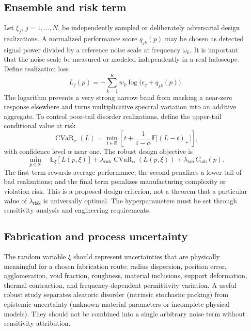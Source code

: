 \documentclass[10.5pt,a4paper]{article}
\newcommand{\CVaR}{\operatorname{CVaR}}
\begin{document}
\subsection{Ensemble and risk term}
Let $\xi_j$, $j=1,\ldots,N$, be independently sampled or deliberately adversarial design realizations. A normalized performance score $q_{jk}(p)$ may be chosen as detected signal power divided by a reference noise scale at frequency $\omega_k$. It is important that the noise scale be measured or modeled independently in a real haloscope. Define realization loss
\begin{equation}
L_j(p)=-\sum_{k=1}^{K}w_k\log\bigl(\epsilon_q+q_{jk}(p)\bigr).
\label{eq:loss}
\end{equation}
The logarithm prevents a very strong narrow band from masking a near-zero response elsewhere and turns multiplicative spectral variation into an additive aggregate. To control poor-tail disorder realizations, define the upper-tail conditional value at risk
\begin{equation}
\CVaR_\alpha(L)=\min_{t\in\mathbb R}\left[t+\frac{1}{1-\alpha}\mathbb E\bigl[(L-t)_+\bigr]\right],
\label{eq:cvar}
\end{equation}
with confidence level $\alpha$ near one. The robust design objective is
\begin{equation}
\boxed{\min_{p\in\mathcal P}\quad \mathbb E_\xi[L(p,\xi)]
+\lambda_{\mathrm{risk}}\CVaR_\alpha(L(p,\xi))
+\lambda_{\mathrm{fab}}\,C_{\mathrm{fab}}(p).}
\label{eq:robustobj}
\end{equation}
The first term rewards average performance; the second penalizes a lower tail of bad realizations; and the final term penalizes manufacturing complexity or violation risk. This is a proposed design criterion, not a theorem that a particular value of $\lambda_{\mathrm{risk}}$ is universally optimal. The hyperparameters must be set through sensitivity analysis and engineering requirements.

\subsection{Fabrication and process uncertainty}
The random variable $\xi$ should represent uncertainties that are physically meaningful for a chosen fabrication route: radius dispersion, position error, agglomeration, void fraction, roughness, material inclusions, support deformation, thermal contraction, and frequency-dependent permittivity variation. A useful robust study separates aleatoric disorder (intrinsic stochastic packing) from epistemic uncertainty (unknown material parameters or incomplete physical models). They should not be combined into a single arbitrary noise term without sensitivity attribution.
\end{document}

